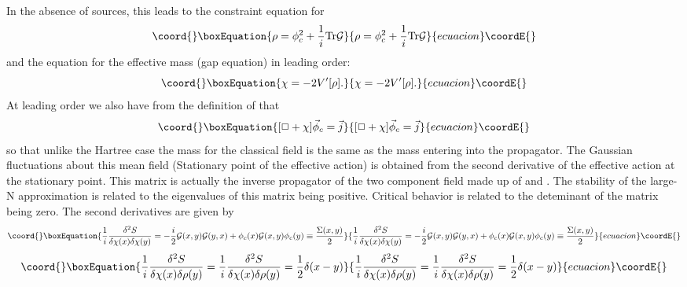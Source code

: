 \documentclass[a4paper,prd,preprint,superscriptaddress,showpacs,byrevtex]{revtex4}
\begin{document}
In the absence of sources, this leads to the constraint equation for \myHighlight{$\rho$}\coordHE{}
\begin{equation}\coord{}\boxEquation{
\rho = \phi_c^2 + \frac{1}{i} {\rm Tr }{\cal G}
}{
\rho = \phi_c^2 + \frac{1}{i} {\rm Tr }{\cal G}
}{ecuacion}\coordE{}\end{equation}
and the equation for the effective mass (gap equation) in leading order:
\begin{equation}\coord{}\boxEquation{
\chi = - 2 V'[\rho].
}{
\chi = - 2 V'[\rho].
}{ecuacion}\coordE{}\end{equation}
At leading order we also have from the definition of \coordHE{} that
\begin{equation}\coord{}\boxEquation{
[\Box + \chi] \vec \phi_c = \vec j
}{
[\Box + \chi] \vec \phi_c = \vec j
}{ecuacion}\coordE{}\end{equation}
so that unlike the Hartree case the mass for the classical field \myHighlight{$\phi$}\coordHE{} is
the same as the mass entering into the propagator.
The Gaussian fluctuations about this mean field (Stationary point of the
effective action)  is obtained from the second derivative of the effective
action at the stationary point. This matrix is actually the inverse
propagator
of the two component field made up of \myHighlight{$\chi$}\coordHE{} and \myHighlight{$\rho$}\coordHE{}.  The stability of
the
large-N approximation is related to the eigenvalues of this matrix being
positive. Critical behavior is related to the deteminant of the matrix being
zero.   The second derivatives are given by
\begin{equation}\coord{}\boxEquation{
\frac{1}{i} \frac {\delta^2 S}{\delta \chi(x) \delta \chi (y)} =
-\frac{i}{2}
{\cal G} (x,y) {\cal G}(y,x) + \phi_c(x) {\cal G}(x,y) \phi_c(y) \equiv
\frac
{\Sigma(x,y)}{2}
}{
\frac{1}{i} \frac {\delta^2 S}{\delta \chi(x) \delta \chi (y)} =
-\frac{i}{2}
{\cal G} (x,y) {\cal G}(y,x) + \phi_c(x) {\cal G}(x,y) \phi_c(y) \equiv
\frac
{\Sigma(x,y)}{2}
}{ecuacion}\coordE{}\end{equation}
\begin{equation}\coord{}\boxEquation{
\frac{1}{i} \frac
{\delta^2 S} {\delta \chi(x) \delta \rho(y)}=\frac{1}{i} \frac {\delta^2 S}
{\delta \chi(x) \delta \rho(y)} =\frac{1}{2} \delta (x-y)
}{
\frac{1}{i} \frac
{\delta^2 S} {\delta \chi(x) \delta \rho(y)}=\frac{1}{i} \frac {\delta^2 S}
{\delta \chi(x) \delta \rho(y)} =\frac{1}{2} \delta (x-y)
}{ecuacion}\coordE{}\end{equation}
\end{document}
